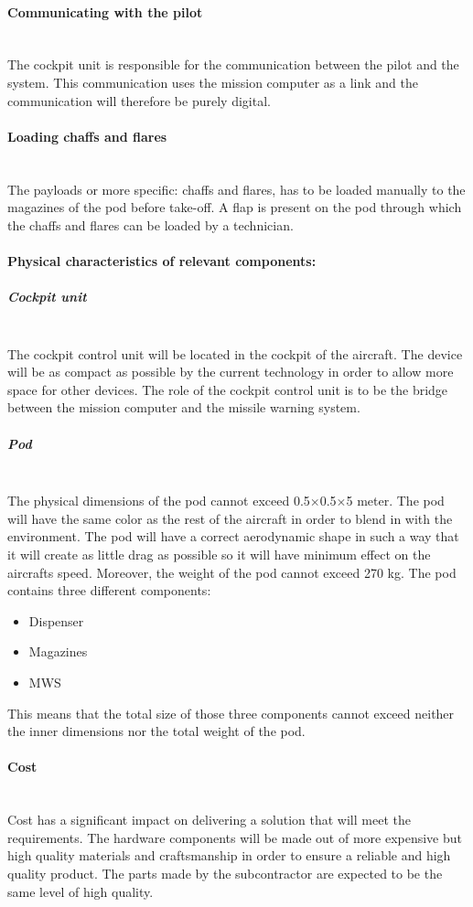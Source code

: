 \paragraph{Communicating with the pilot}  \makebox{} \\
The cockpit unit is responsible for the communication between the pilot and the system. This communication uses the mission computer as a link and the communication will therefore be purely digital.

\paragraph{Loading chaffs and flares}  \makebox{} \\
The payloads or more specific: chaffs and flares, has to be loaded manually to the magazines of the pod before take-off. A flap is present on the pod through which the chaffs and flares can be loaded by a technician.

\paragraph{Physical characteristics of relevant components:} 

\subparagraph{Cockpit unit}  \makebox{} \\
The cockpit control unit will be located in the cockpit of the aircraft. The device will be as compact as possible by the current technology in order to allow more space for other devices. The role of the cockpit control unit is to be the bridge between the mission computer and the missile warning system.

\subparagraph{Pod}  \makebox{} \\
The physical dimensions of the pod cannot exceed 0.5$\times$0.5$\times$5 meter. The pod will have the same color as the rest of the aircraft in order to blend in with the environment. The pod will have a correct aerodynamic shape in such a way that it will create as little drag as possible so it will have minimum effect on the aircrafts speed.  Moreover, the weight of the pod cannot exceed 270 kg.
The pod contains three different components:
\begin{itemize}
\item Dispenser
\item Magazines
\item MWS
\end{itemize}

This means that the total size of those three components cannot exceed neither the inner dimensions nor the total weight of the pod. 

\paragraph{Cost} \makebox{} \\
Cost has a significant impact on delivering a solution that will meet the requirements. The hardware components will be made out of more expensive but high quality materials and craftsmanship in order to ensure a reliable and high quality product. The parts made by the subcontractor are expected to be the same level of high quality.  


